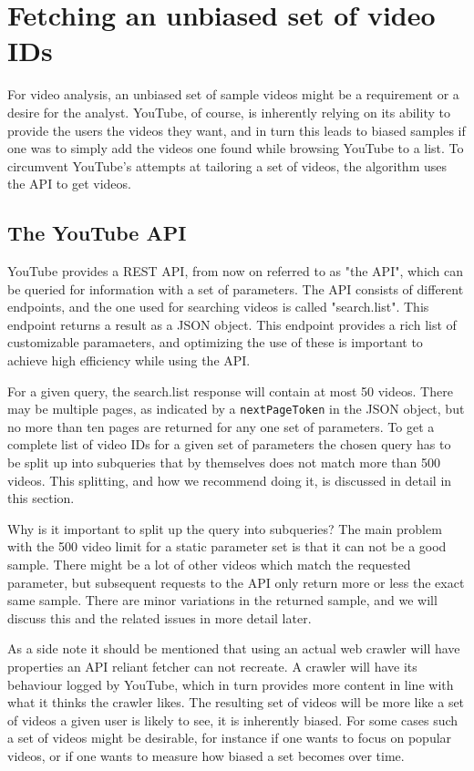 \section{Fetching an unbiased set of video IDs}
For video analysis, an unbiased set of sample videos might be a requirement or
a desire for the analyst. YouTube, of course, is inherently relying on its
ability to provide the users the videos they want, and in turn this leads to
biased samples if one was to simply add the videos one found while
browsing YouTube to a list. To circumvent YouTube's attempts at tailoring a set
of videos, the algorithm uses the API to get videos.

\subsection{The YouTube API}
YouTube provides a REST API, from now on referred to as "the API", which can be
queried for information with a set of parameters. The API consists of different
endpoints, and the one used for searching videos is called "search.list". This
endpoint returns a result as a JSON object. This endpoint provides a rich list
of customizable paramaeters, and optimizing the use of these is important to
achieve high efficiency while using the API. 

For a given query, the search.list response will contain at most 50 videos. There
may be multiple pages, as indicated by a \texttt{nextPageToken} in the JSON
object, but no more than ten pages are returned for any one set of parameters.
To get a complete list of video IDs for a given set of parameters the chosen
query has to be split up into subqueries that by themselves does not match more
than 500 videos. This splitting, and how we recommend doing it, is discussed in
detail in this section.

Why is it important to split up the query into subqueries? The main problem with
the 500 video limit for a static parameter set is that it can not be a good
sample. There might be a lot of other videos which match the requested
parameter, but subsequent requests to the API only return more or less the exact
same sample. There are minor variations in the returned sample, and we will 
discuss this and the related issues in more detail later. 

As a side note it should be mentioned that using an actual web crawler will have
properties an API reliant fetcher can not recreate. A crawler will have its 
behaviour logged by YouTube, which in turn provides more content in line with
what it thinks the crawler likes. The resulting set of videos will be more like
a set of videos a given user is likely to see, it is inherently biased. For some
cases such a set of videos might be desirable, for instance if one wants to
focus on popular videos, or if one wants to measure how biased a set becomes
over time.

